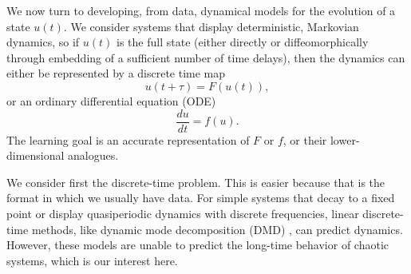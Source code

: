 \documentclass[preprint,aps,pre,letterpaper,onecolumn,superscriptaddress]{revtex4-2} %
\newcommand{\MDG}[1]{\textcolor{magenta}{*** #1 ***}}
\begin{document}
We now turn to developing, from data, dynamical models for the evolution of a state $u(t)$.  We consider systems that display deterministic, Markovian dynamics, so if $u(t)$ is the full state (either directly or diffeomorphically through embedding of a sufficient number of time delays), then the
dynamics can either be represented by a discrete time map 
\begin{equation}\label{eq:discrete}
	u(t+\tau)=F(u(t)),%
\end{equation}
or 
an ordinary differential equation (ODE)
\begin{equation}\label{eq:ODE}
	\dfrac{d u}{d t}=f(u).
\end{equation} 
The learning goal is an accurate representation of $F$ or $f$, or their lower-dimensional analogues.

We consider first the discrete-time problem. This is easier because that is the format in which we usually have data. For simple systems that decay to a fixed point or display quasiperiodic dynamics with discrete frequencies, linear discrete-time methods, like dynamic mode decomposition (DMD) \cite{DMDBook},
can predict dynamics. However, these models are unable to predict the long-time behavior of chaotic systems, which is our interest here.
\end{document}

